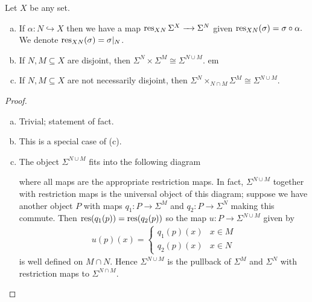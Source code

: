 \documentclass{article}
\begin{document}
\begin{prop}Let $X$ be any set.
  \begin{enumerate}[(a)]
    \item If $\alpha:N \hookrightarrow X$ then we have a map $\res_{XN}\Sigma^X \to \Sigma^N$ given $\operatorname{res}_{XN}(\sigma) = \sigma \circ \alpha.$ We denote $\operatorname{res}_{XN}(\sigma) = \sigma|_N$.
  \item If $N, M \subseteq X$ are disjoint, then $\Sigma^N \times \Sigma^M \cong \Sigma^{N \cup M}$. em
  \item If $N, M \subseteq X$ are not necessarily disjoint, then $\Sigma^N \times_{N\cap M} \Sigma^M \cong \Sigma^{N\cup M}$.
  \end{enumerate}
\end{prop}
\begin{proof}$ $
  \begin{enumerate}[(a)]
    \item Trivial; statement of fact.
    \item This is a special case of (c).
    \item The object $\Sigma^{N\cup M}$ fits into the following diagram
      \begin{center}
      \end{center}
      where all maps are the appropriate restriction maps. In fact, $\Sigma^{N\cup M}$ together with restriction maps is the universal object of this diagram; suppose we have another object $P$ with maps $q_1:P \to \Sigma^M$ and $q_2:P\to \Sigma^N$ making this commute. Then $\operatorname{res}(q_1(p)) = \operatorname{res}(q_2(p))$ so the map $u: P\to \Sigma^{N\cup M}$ given by
      \begin{align*}
        u(p)(x) =
        \begin{cases}
          q_1(p)(x) & x \in M \\
          q_2(p)(x) & x \in N
        \end{cases}
      \end{align*}
      is well defined on $M\cap N$. Hence $\Sigma^{N\cup M}$ is the pullback of $\Sigma^M$ and $\Sigma^N$ with restriction maps to $\Sigma^{N\cap M}$.
  \end{enumerate}
\end{proof}
\end{document}
